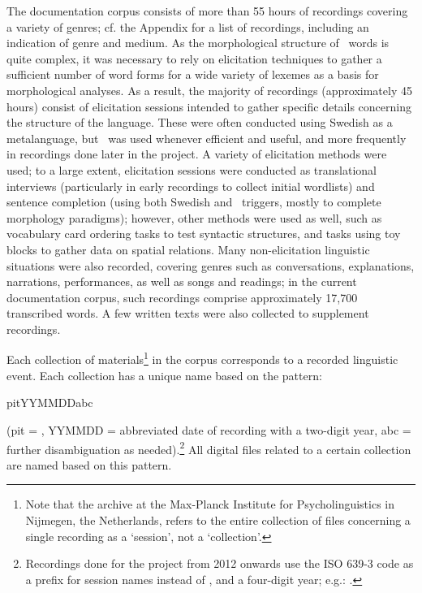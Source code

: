 The documentation corpus consists of more than 55 hours of recordings covering a variety of genres; cf. the Appendix for a list of recordings, including an indication of genre and medium. 
As the morphological structure of \PS\ words is quite complex, %
it was necessary to rely on elicitation techniques to gather a sufficient number of word forms for a wide variety of lexemes as a basis for morphological analyses. 
As a result, the majority of recordings (approximately 45 hours) consist of elicitation sessions intended to gather specific details concerning the structure of the language. 
These were often conducted using Swedish as a metalanguage, but \PS\ was used whenever efficient and useful, and more frequently in recordings done later in the project. 
A variety of elicitation methods were used; to a large extent, elicitation sessions were conducted as translational interviews (particularly in early recordings to collect initial wordlists) and sentence completion (using both Swedish and \PS\ triggers, mostly to complete morphology paradigms); however, other methods were used as well, such as vocabulary card ordering tasks to test syntactic structures, and tasks using toy blocks to gather data on spatial relations. 
Many non-elicitation linguistic situations were also recorded, covering genres such as conversations, explanations, narrations, performances, as well as songs and readings; in the current documentation corpus, such recordings comprise approximately 17,700 transcribed words. A few written texts were also collected to supplement recordings. 

Each collection of materials\footnote{Note that the archive at the Max-Planck Institute for Psycholinguistics in Nijmegen, the Netherlands, refers to the entire collection of files concerning a single recording as a ‘session’, not a ‘collection’.} 
in the corpus corresponds to a recorded linguistic event. Each collection has a unique name based on the pattern:
\begin{center} pitYYMMDDabc \end{center}
(pit = \PS, YYMMDD = abbreviated date of recording with a two-digit year, abc = further disambiguation as needed).\footnote{Recordings done for the project from 2012 onwards use the ISO 639-3 code  as a prefix for session names instead of , and a four-digit year; e.g.: .} 
All digital files related to a certain collection are named based on this pattern. 

